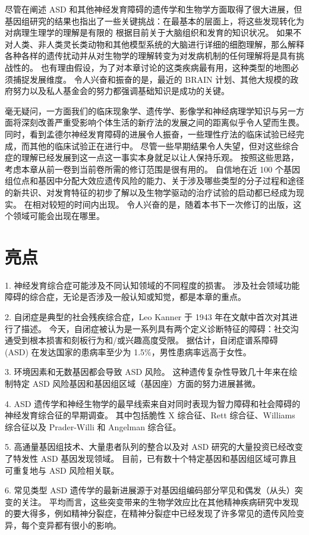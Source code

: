 尽管在阐述 ASD 和其他神经发育障碍的遗传学和生物学方面取得了很大进展，但基因组研究的结果也指出了一些关键挑战：在最基本的层面上，将这些发现转化为对病理生理学的理解是有限的 根据目前关于大脑组织和发育的知识状况。 如果不对人类、非人类灵长类动物和其他模型系统的大脑进行详细的细胞理解，那么解释各种各样的遗传扰动并从对生物学的理解转变为对发病机制的任何理解将是具有挑战性的。 也有理由假设，为了对本章讨论的这类疾病最有用，这种类型的地图必须捕捉发展维度。 令人兴奋和振奋的是，最近的 BRAIN 计划、其他大规模的政府努力以及私人基金会的努力都强调基础知识是成功的关键。

毫无疑问，一方面我们的临床现象学、遗传学、影像学和神经病理学知识与另一方面将深刻改善严重受影响个体生活的新疗法的发展之间的距离似乎令人望而生畏。 同时，看到孟德尔神经发育障碍的进展令人振奋，一些理性疗法的临床试验已经完成，而其他的临床试验正在进行中。 尽管一些早期结果令人失望，但对这些综合症的理解已经发展到这一点这一事实本身就足以让人保持乐观。 按照这些思路，考虑本章从前一卷到当前卷所需的修订范围是很有用的。 自信地在近 100 个基因组位点和基因中分配大效应遗传风险的能力、关于涉及哪些类型的分子过程和途径的新共识、对发育特征的初步了解以及生物学驱动的治疗试验的启动都已经成为现实。 在相对较短的时间内出现。 令人兴奋的是，随着本书下一次修订的出版，这个领域可能会出现在哪里。


\section{亮点}
1. 神经发育综合症可能涉及不同认知领域的不同程度的损害。 涉及社会领域功能障碍的综合症，无论是否涉及一般认知或知觉，都是本章的重点。 

2. 自闭症是典型的社会残疾综合症，Leo Kanner 于 1943 年在文献中首次对其进行了描述。 今天，自闭症被认为是一系列具有两个定义诊断特征的障碍：社交沟通受到根本损害和刻板行为和/或兴趣高度受限。 据估计，自闭症谱系障碍 (ASD) 在发达国家的患病率至少为 1.5\%，男性患病率远高于女性。 

3. 环境因素和无数基因都会导致 ASD 风险。 这种遗传复杂性导致几十年来在绘制特定 ASD 风险基因和基因组区域（基因座）方面的努力进展甚微。 

4. ASD 遗传学和神经生物学的最早线索来自对同时表现为智力障碍和社会障碍的神经发育综合征的早期调查。 其中包括脆性 X 综合征、Rett 综合征、Williams 综合征以及 Prader-Willi 和 Angelman 综合征。 

5. 高通量基因组技术、大量患者队列的整合以及对 ASD 研究的大量投资已经改变了特发性 ASD 基因发现领域。 目前，已有数十个特定基因和基因组区域可靠且可重复地与 ASD 风险相关联。 

6. 常见类型 ASD 遗传学的最新进展源于对基因组编码部分罕见和偶发（从头）突变的关注。 平均而言，这些突变带来的生物学效应比在其他精神疾病研究中发现的要大得多，例如精神分裂症，在精神分裂症中已经发现了许多常见的遗传风险变异，每个变异都有很小的影响。 

